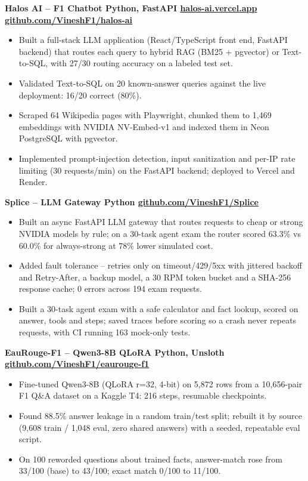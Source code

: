 \documentclass[letterpaper,11pt]{article}
\begin{document}
\textbf{Halos AI -- F1 Chatbot \textbar\; Python, FastAPI \;\textbar\; \href{https://halos-ai.vercel.app}{halos-ai.vercel.app} \;\textbar\; \href{https://github.com/VineshF1/halos-ai}{github.com/VineshF1/halos-ai}}
\hfill
\begin{itemize}
\item Built a full-stack LLM application (React/TypeScript front end, FastAPI backend) that routes each query to hybrid RAG (BM25 + pgvector) or Text\mbox{-}to\mbox{-}SQL, with 27/30 routing accuracy on a labeled test set.
\item Validated Text-to-SQL on 20 known-answer queries against the live deployment: 16/20 correct (80\%).
\item Scraped 64 Wikipedia pages with Playwright, chunked them to 1,469 embeddings with NVIDIA NV-Embed-v1 and indexed them in Neon PostgreSQL with pgvector.
\item Implemented prompt-injection detection, input sanitization and per-IP rate limiting (30 requests/min) on the FastAPI backend; deployed to Vercel and Render.
\end{itemize}
\vspace{2pt}

\textbf{Splice -- LLM Gateway \;\textbar\; Python \;\textbar\; \href{https://github.com/VineshF1/Splice}{github.com/VineshF1/Splice}}
\hfill
\begin{itemize}
\item Built an async FastAPI LLM gateway that routes requests to cheap or strong NVIDIA models by rule; on a 30-task agent exam the router scored 63.3\% vs 60.0\% for always-strong at 78\% lower simulated cost.
\item Added fault tolerance -- retries only on timeout/429/5xx with jittered backoff and Retry-After, a backup model, a 30 RPM token bucket and a SHA-256 response cache; 0 errors across 194 exam requests.
\item Built a 30-task agent exam with a safe calculator and fact lookup, scored on answer, tools and steps; saved traces before scoring so a crash never repeats requests, with CI running 163 mock-only tests.
\end{itemize}
\vspace{2pt}

\textbf{EauRouge-F1 -- Qwen3-8B QLoRA \;\textbar\; Python, Unsloth \;\textbar\; \href{https://github.com/VineshF1/eaurouge-f1}{github.com/VineshF1/eaurouge-f1}}
\begin{itemize}
\item Fine-tuned Qwen3-8B (QLoRA r=32, 4-bit) on 5,872 rows from a 10,656-pair F1 Q\&A dataset on a Kaggle T4: 216 steps, resumable checkpoints.
\item Found 88.5\% answer leakage in a random train/test split; rebuilt it by source (9,608 train / 1,048 eval, zero shared answers) with a seeded, repeatable eval script.
\item On 100 reworded questions about trained facts, answer-match rose from 33/100 (base) to 43/100; exact match 0/100 to 11/100.
\end{itemize}
\end{document}
